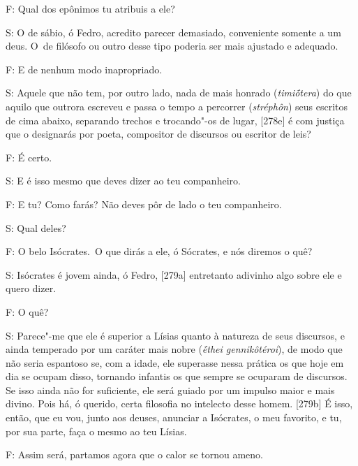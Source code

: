  

F: Qual dos epônimos tu atribuis a ele?

 

S: O de sábio, ó Fedro, acredito parecer demasiado, conveniente somente
a um deus. O~de filósofo ou outro desse tipo poderia ser mais ajustado e
adequado.

 

F: E de nenhum modo inapropriado.

 

S: Aquele que não tem, por outro lado, nada de mais honrado
(\emph{timiṓtera}) do que aquilo que outrora escreveu e passa o tempo a
percorrer (\emph{stréphôn}) seus escritos de cima abaixo, separando
trechos e trocando"-os de lugar, [278e] é com justiça que o
designarás por poeta, compositor de discursos ou escritor de leis?

 

F: É certo.

 

S: E é isso mesmo que deves dizer ao teu companheiro.

 

F: E tu? Como farás? Não deves pôr de lado o teu companheiro.

 

S: Qual deles?

 

F: O belo Isócrates.~O que dirás a ele, ó Sócrates, e nós diremos o quê?

 

S: Isócrates é jovem ainda, ó Fedro, [279a] entretanto adivinho algo
sobre ele e quero dizer.

 

F: O quê?

 

S: Parece"-me que ele é superior a Lísias quanto à natureza de seus
discursos, e ainda temperado por um caráter mais nobre (\emph{ḗthei
gennikôtéroi}), de modo que não seria espantoso se, com a idade, ele
superasse nessa prática os que hoje em dia se ocupam disso, tornando
infantis os que sempre se ocuparam de discursos. Se isso ainda não for
suficiente, ele será guiado por um impulso maior e mais divino. Pois há,
ó querido, certa filosofia no intelecto desse homem. [279b] É isso,
então, que eu vou, junto aos deuses, anunciar a Isócrates, o meu
favorito, e tu, por sua parte, faça o mesmo ao teu Lísias.

 

F: Assim será, partamos agora que o calor se tornou ameno.

